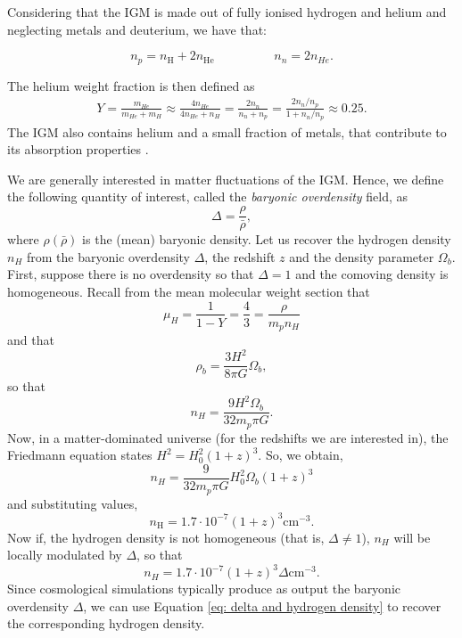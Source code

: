 Considering that the IGM is made out of fully ionised hydrogen and helium and neglecting metals and deuterium, we have that:

\begin{equation}
    n_p=n_\mathrm{H}+2n_\mathrm{He} \hspace{2cm} n_n=2n_{He}.
\end{equation}

The helium weight fraction is then defined as
\begin{eqnarray}
    Y=\frac{m_{He}}{m_{He}+m_H}\approx \frac{4n_{He}}{4n_{He}+n_H}=\frac{2n_n}{n_n+n_p}=\frac{2 n_n/n_p}{1+n_n/n_p}\approx 0.25 .
\end{eqnarray}
The IGM also contains helium and a small fraction of metals, that contribute to its absorption properties \cite{Simcoe_2004}.

We are generally interested in matter fluctuations of the IGM. Hence, we define the following quantity of interest, called the \emph{baryonic overdensity} field, as 
\begin{equation}
    \Delta =\frac{\rho}{\bar{\rho}},
\end{equation}
where $\rho(\bar{\rho})$ is the (mean) baryonic density. Let us recover the hydrogen density $n_H$ from the baryonic overdensity $\Delta$, the redshift $z$ and the density parameter $\Omega_b$.
First, suppose there is no overdensity so that $\Delta=1$ and the comoving density is homogeneous. Recall from the mean molecular weight section that
\begin{equation}
    \mu_H=\frac{1}{1-Y}=\frac{4}{3}=\frac{\rho}{m_pn_H}
\end{equation}
and that
\begin{equation}
    \rho_b=\frac{3H^2}{8\pi G}\Omega_b,
\end{equation}
so that
\begin{equation}
    n_H=\frac{9H^2 \Omega_b}{32m_p\pi G}.
\end{equation}
Now, in a matter-dominated universe (for the redshifts we are interested in), the Friedmann equation states $H^2=H_0^2(1+z)^3$.
So, we obtain,
\begin{equation}
    n_H=\frac{9}{32m_p\pi G}H_0^2\Omega_b (1+z)^3
\end{equation}
and substituting values,
\begin{equation}
    n_\mathrm{H}=1.7\cdot 10^{-7}(1+z)^3 \mathrm{cm}^{-3}.
\end{equation}
Now if, the hydrogen density is not homogeneous (that is, $\Delta \neq 1$), $n_H$ will be locally modulated by $\Delta$, so that
\begin{equation}\label{eq: delta and hydrogen density}
    n_H=1.7\cdot 10^{-7}(1+z)^3 \Delta \mathrm{cm}^{-3} .
\end{equation}
Since cosmological simulations typically produce as output the baryonic overdensity $\Delta$, we can use Equation \ref{eq: delta and hydrogen density} to recover the corresponding hydrogen density.

